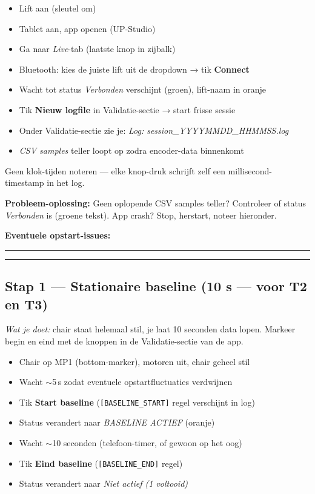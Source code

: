 \documentclass[11pt, a4paper]{article}
\newcommand{\fillblock}[1]{\rule[-0.5ex]{#1}{0.4pt}}
\begin{document}
\begin{itemize}[leftmargin=2em, label=$\square$]
  \item Lift aan (sleutel om)
  \item Tablet aan, app openen (UP-Studio)
  \item Ga naar \emph{Live}-tab (laatste knop in zijbalk)
  \item Bluetooth: kies de juiste lift uit de dropdown → tik \textbf{Connect}
  \item Wacht tot status \emph{Verbonden} verschijnt (groen), lift-naam in oranje
  \item Tik \textbf{Nieuw logfile} in Validatie-sectie → start frisse sessie
  \item Onder Validatie-sectie zie je: \emph{Log: session\_YYYYMMDD\_HHMMSS.log}
  \item \emph{CSV samples} teller loopt op zodra encoder-data binnenkomt
\end{itemize}

Geen klok-tijden noteren --- elke knop-druk schrijft zelf een
millisecond-timestamp in het log.

\begin{notebox}
\small \textbf{Probleem-oplossing:} Geen oplopende CSV samples teller?
Controleer of status \emph{Verbonden} is (groene tekst). App crash?
Stop, herstart, noteer hieronder.
\end{notebox}

\textbf{Eventuele opstart-issues:}

\fillblock{\textwidth}\hfill\fillblock{\textwidth}

\subsection{Stap 1 — Stationaire baseline (10 s — voor T2 en T3)}

\textit{Wat je doet:} chair staat helemaal stil, je laat 10 seconden
data lopen. Markeer begin en eind met de knoppen in de
Validatie-sectie van de app.

\begin{itemize}[leftmargin=2em, label=$\square$]
  \item Chair op MP1 (bottom-marker), motoren uit, chair geheel stil
  \item Wacht $\sim$5\,s zodat eventuele opstartfluctuaties verdwijnen
  \item Tik \textbf{Start baseline} (\texttt{[BASELINE\_START]} regel verschijnt in log)
  \item Status verandert naar \emph{BASELINE ACTIEF} (oranje)
  \item Wacht $\sim$10 seconden (telefoon-timer, of gewoon op het oog)
  \item Tik \textbf{Eind baseline} (\texttt{[BASELINE\_END]} regel)
  \item Status verandert naar \emph{Niet actief (1 voltooid)}
\end{itemize}
\end{document}
